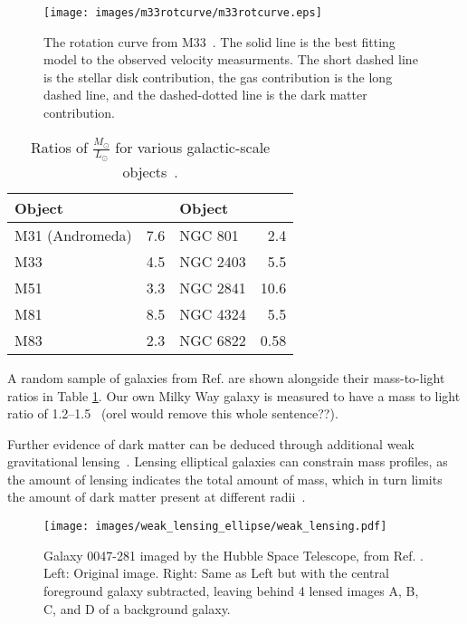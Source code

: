 \begin{figure}[ht]
  \texttt{[image: images/m33rotcurve/m33rotcurve.eps]}
  \caption[M33 Rotation Curve]{
    The rotation curve from M33~\cite{m33rotcurve}.
    The solid line is the best fitting model to the observed velocity measurments.
    The short dashed line is the stellar disk contribution, the gas contribution is the long dashed line, and the dashed-dotted line is the dark matter contribution.
  }
  \label{fig:m33rotcurve}
\end{figure}

\begin{table}[]
  \centering
  \caption[Ratios of \mlratio{} for Various Galactic-scale Objects]{Ratios of $\frac{M_\odot}{L_\odot}$ for various galactic-scale objects~\cite{faber_ml}.}
  \label{tab:mlratios}
  \begin{tabular}{l r | l r}
    Object      &  \mlratio{} & Object & \mlratio{} \\
    \hline
    M31 (Andromeda) &  7.6  & NGC 801  &  2.4  \\
    M33             &  4.5  & NGC 2403 &  5.5  \\
    M51             &  3.3  & NGC 2841 & 10.6  \\
    M81             &  8.5  & NGC 4324 &  5.5  \\
    M83             &  2.3  & NGC 6822 &  0.58 \\
  \end{tabular}
\end{table}
      
A random sample of galaxies from Ref. \cite{faber_ml} are shown alongside their mass-to-light ratios in Table \ref{tab:mlratios}.
Our own Milky Way galaxy is measured to have a mass to light ratio of \SIrange{1.2}{1.5}{}~\cite{milkyway_ml_ratio} {\color{red}(orel would remove this whole sentence??)}.

Further evidence of dark matter can be deduced through additional weak gravitational lensing~\cite{weak_lensing_2001}.
Lensing elliptical galaxies can constrain mass profiles, as the amount of lensing indicates the total amount of mass, which in turn limits the amount of dark matter present at different radii~\cite{weak_lensing_ellipse}.

\begin{figure}
  \centering
  \texttt{[image: images/weak\_lensing\_ellipse/weak\_lensing.pdf]}
  \caption[Weak Lensing with an Ellipse Galaxy]{
    Galaxy 0047-281 imaged by the Hubble Space Telescope, from Ref. \cite{weak_lensing_ellipse}.
    Left: Original image.
    Right: Same as Left but with the central foreground galaxy subtracted, leaving behind 4 lensed images A, B, C, and D of a background galaxy.
  }
  \label{fig:ellipse}
\end{figure}
    
